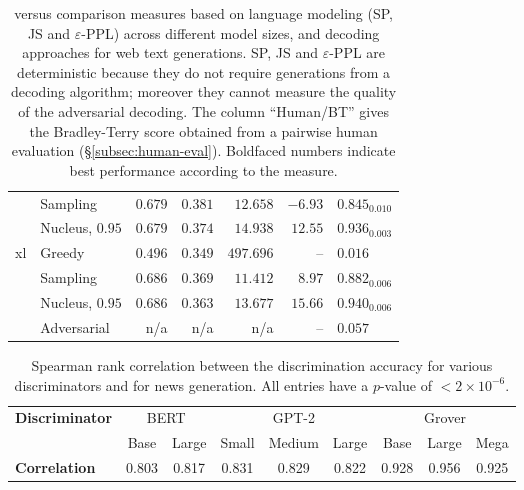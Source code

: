 \documentclass{article}
\theoremstyle{definition}
\newcommand \eps \varepsilon
\newcommand{\name}{{\fontfamily{bch}\selectfont{\textsc{Mauve}}}\xspace}
\newcommand{\tabemph}[1]{\cellcolor{lightmauve!30}\textcolor{black!50!royalazure}{#1}}%
\begin{document}
\begin{table}[t!]
\begin{adjustbox}{max width=0.7\textwidth}
\begin{tabular}{llrrrrl}
& Sampling &     $0.679$ &           $0.381$ &                     $12.658$ &              $-6.93$ &            $0.845_{0.010}$ \\
      & Nucleus, $0.95$ &    $0.679$ &           $0.374$ &                     $14.938$ &              $12.55$ &            $0.936_{0.003}$ \\
\midrule[0.03em]
\multirow{4}{*}{xl} & Greedy &                      $0.496$ &  \tabemph{$\mathbf{0.349}$} &                    $497.696$ &              --        &                    $0.016$ \\
    & Sampling &      \tabemph{$\mathbf{0.686}$} &           $0.369$ &            \tabemph{$\mathbf{11.412}$} &               $8.97$ &            $0.882_{0.006}$ \\
      & Nucleus, $0.95$ &            $0.686$ &           $0.363$ &                     $13.677$ &    \tabemph{$\mathbf{15.66}$} &   \tabemph{$\mathbf{0.940}_{0.006}$} \\
      & Adversarial &           n/a &           n/a &                     n/a &             -- &            $0.057$ \\
\bottomrule
\end{tabular}
 \end{adjustbox}
\caption{\name versus comparison measures based on language modeling (SP, JS and $\eps$-PPL) across different model sizes, and decoding approaches for web text generations. 
SP, JS and $\eps$-PPL are deterministic because they do not require generations from a decoding algorithm; moreover they cannot measure the quality of the adversarial decoding.
The column ``Human/BT'' gives the Bradley-Terry score obtained from a pairwise human evaluation (\S\ref{subsec:human-eval}).
Boldfaced numbers indicate best performance according to the measure.
}
\label{tab:mauve:expt:webtext-app-LM}
\end{table}


\begin{table}[t!]
\centering
%
{\small
\begin{tabular}{lcccccccc}
\toprule
\multirow{2}{*}{\bf Discriminator}
& \multicolumn{2}{c}{BERT}
& \multicolumn{3}{c}{GPT-2}
& \multicolumn{3}{c}{Grover} \\
\cmidrule(lr){2-3}
\cmidrule(lr){4-6}
\cmidrule(lr){7-9}
& Base & Large & Small & Medium & Large & Base & Large & Mega \\
\midrule
\bf Correlation & 0.803 & 0.817 & 0.831 & 0.829 & 0.822 & 0.928 & 0.956 & 0.925 \\
\bottomrule
\end{tabular}


%
%
%
%
%
%
%
%
%
%
%
%
%
%
%
%
 }
%
\vspace{0.5mm}
\caption{Spearman rank correlation between the discrimination accuracy
for various discriminators and \name for news generation. 
All entries have a $p$-value of $<2\times 10^{-6}$.
}
\label{tab:mauve:expt:grover-disctype}
\end{table}
\end{document}
